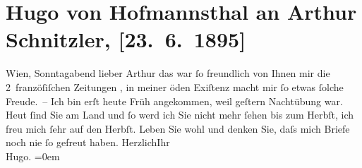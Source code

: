 

         \renewcommand{\erwaehnteOrte}{Orte: Frankreich, Wien}
         \renewcommand{\erwaehnteWerke}{}
               \section[Hugo von Hofmannsthal an Arthur Schnitzler, {[}23. 6. 1895{]}]{ Hugo von Hofmannsthal an Arthur Schnitzler, {[}23. 6. 1895{]}}\nopagebreak{}\rehead{ }\begin{ledgroupsized}[t]{13cm}\normalsize\beginnumbering \toendnotes[C]{\smallbreak\pagebreak[2]} 
\toendnotes[C]{\smallbreak}\pstart
           \raggedleft{}{\pb}Wien, Sonntagabend\pend
           \pstart{}lieber Arthur\pend\pstart
           das war ſo freundlich von Ihnen mir die 2 franzöſiſchen Zeitungen \label{K_L00458_1v}\label{K_L00458_1h}, in meiner öden Exiſtenz macht
               mir ſo etwas ſolche Freude. – Ich bin erſt heute Früh angekommen, weil
                  geſtern Nachtübung war. Heut ſind Sie am Land und ſo werd ich Sie
               nicht mehr ſehen bis zum Herbſt, ich freu mich ſehr auf den Herbſt.
               Leben Sie wohl und denken Sie, daſs mich Briefe noch nie ſo gefreut haben.\pend
           \pstart
           Herzlich\hspace*{3.5em}Ihr{\\[\baselineskip]}\spacefill\mbox{Hugo.}\pend
           \leftskip=0em{}
         
         \endnumbering{}\end{ledgroupsized}  \newcommand{\dateiname}{L00458}\newcommand{\titel}{Hugo von Hofmannsthal an Arthur Schnitzler, [23. 6. 1895]}\newcommand{\editorInnen}{Martin Anton Müller und Gerd-Hermann Susen}
      